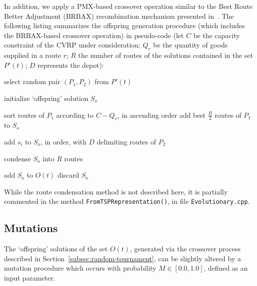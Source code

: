In addition, we apply a PMX-based crossover operation similar to the Best 
Route Better Adjustment (BRBAX) recombination mechanism presented 
in~\cite{Bermudez2010}. The following listing summarizes the offspring 
generation procedure (which includes the BRBAX-based crossover operation) in 
pseudo-code (let $C$ be the capacity constraint of the CVRP under consideration; 
$Q_r$ be the quantity of goods supplied in a route $r$; $R$ the number of 
routes of the solutions contained in the set $P'(t)$; $D$ represents the depot):\vertbreak

\begin{algorithmic}[1]


    \Repeat
        \State select random pair $(P_1,P_2)$ from $P'(t)$

    \State initialize `offspring' solution $S_o$

    \State sort routes of $P_1$ according to $C - Q_r$, 
    \Statex[2] in ascending order
    \State add best $\frac{R}{2}$ routes of $P_1$ to $S_o$

                \State add $s_i$ to $S_o$, in order, 
                \Statex[5] with $D$ delimiting routes of $P_2$
            \EndIf
        \EndFor
    \EndFor

        \State condense $S_o$ into $R$ routes
    \EndIf

        \State add $S_o$ to $O(t)$
    \Else
        \State discard $S_o$
    \EndIf

\EndWhile

\end{algorithmic}\vertbreak

While the route condensation method is not described here, it is partially commented 
in the method \verb+FromTSPRepresentation()+, in file \verb+Evolutionary.cpp+.\vertbreak

\subsection{Mutations}
\label{subsec:mutations}

The `offspring' solutions of the set $O(t)$, generated via the crossover 
process described in Section~\ref{subsec:random-tournament}, can be slightly 
altered by a mutation procedure which occurs with probability 
$M \in [0.0, 1.0]$, defined as an input parameter.\vertbreak 

